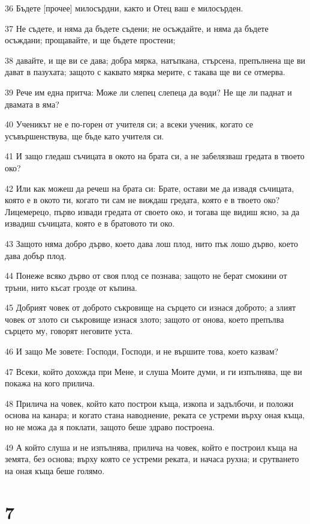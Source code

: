 \par 36 Бъдете [прочее] милосърдни, както и Отец ваш е милосърден.
\par 37 Не съдете, и няма да бъдете съдени; не осъждайте, и няма да бъдете осъждани; прощавайте, и ще бъдете простени;
\par 38 давайте, и ще ви се дава; добра мярка, натъпкана, стърсена, препълнена ще ви дават в пазухата; защото с каквато мярка мерите, с такава ще ви се отмерва.
\par 39 Рече им една притча: Може ли слепец слепеца да води? Не ще ли паднат и двамата в яма?
\par 40 Ученикът не е по-горен от учителя си; а всеки ученик, когато се усъвършенствува, ще бъде като учителя си.
\par 41 И защо гледаш съчицата в окото на брата си, а не забелязваш гредата в твоето око?
\par 42 Или как можеш да речеш на брата си: Брате, остави ме да извадя съчицата, която е в окото ти, когато ти сам не виждаш гредата, която е в твоето око? Лицемерецо, първо извади гредата от своето око, и тогава ще видиш ясно, за да извадиш съчицата, която е в братовото ти око.
\par 43 Защото няма добро дърво, което дава лош плод, нито пък лошо дърво, което дава добър плод.
\par 44 Понеже всяко дърво от своя плод се познава; защото не берат смокини от тръни, нито късат грозде от къпина.
\par 45 Добрият човек от доброто съкровище на сърцето си изнася доброто; а злият човек от злото си съкровище изнася злото; защото от онова, което препълва сърцето му, говорят неговите уста.
\par 46 И защо Ме зовете: Господи, Господи, и не вършите това, което казвам?
\par 47 Всеки, който дохожда при Мене, и слуша Моите думи, и ги изпълнява, ще ви покажа на кого прилича.
\par 48 Прилича на човек, който като построи къща, изкопа и задълбочи, и положи основа на канара; и когато стана наводнение, реката се устреми върху оная къща, но не можа да я поклати, защото беше здраво построена.
\par 49 А който слуша и не изпълнява, прилича на човек, който е построил къща на земята, без основа; върху която се устреми реката, и начаса рухна; и срутването на оная къща беше голямо.

\chapter{7}

